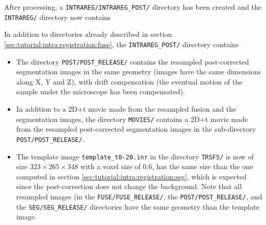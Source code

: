 After processing, a \texttt{INTRAREG/INTRAREG\_POST/} directory has
been created and the \texttt{INTRAREG/} directory now contains

\mbox{}
\mbox{}

In addition to directories already described in section
\ref{sec:tutorial:intra:registration:fuse}, the \texttt{INTRAREG\_POST/} directory contains
\begin{itemize}
\itemsep -1ex
\item The directory \texttt{POST/POST\_RELEASE/} contains the resampled
  post-corrected segmentation images
  in the same geometry (images have the same dimensions along X, Y and
  Z), with drift compensation (the eventual motion of the sample under the
  microscope has been compensated). 
\item In addition to a 2D+t movie made from the resampled fusion
  and the segmentation images, the directory \texttt{MOVIES/} contains
  a 2D+t movie made from the resampled post-corrected segmentation
  images in the sub-directory \texttt{POST/POST\_RELEASE/}.
\item The template image \texttt{template\_t0-20.inr} in the directory
  \texttt{TRSFS/} 
  is now of size $323 \times 265 \times 348$ with a voxel size of 0.6,
  has the same size than the one computed in section
  \ref{sec:tutorial:intra:registration:seg},  which is expected since
  the post-correction does not change the background.
  Note that all resampled images (in the \texttt{FUSE/FUSE\_RELEASE/}, the
  \texttt{POST/POST\_RELEASE/}, and the
  \texttt{SEG/SEG\_RELEASE/} directories have the same geometry than the template
  image. 
\end{itemize}



